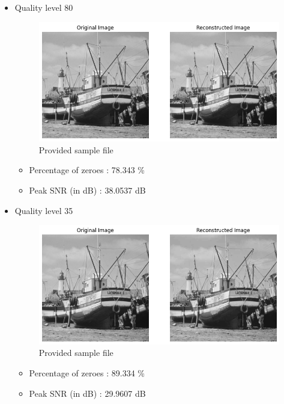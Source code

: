 \documentclass[11pt,a4paper]{article}
\begin{document}
\begin{itemize}
    \item Quality level 80
    {\begin{figure}[h]
        \centering
        \includegraphics[width=1.0\linewidth]{images/im2q1.png}
        \caption{Provided sample file}
    \end{figure}}

    \begin{itemize}
        \item Percentage of zeroes : 78.343 \%
        \item Peak SNR (in dB)     : 38.0537 dB
    \end{itemize}



    \item Quality level 35
    {\begin{figure}[h]
        \centering
        \includegraphics[width=1.0\linewidth]{images/im2q2.png}
        \caption{Provided sample file}
    \end{figure}}

    \begin{itemize}
        \item Percentage of zeroes : 89.334 \%
        \item Peak SNR (in dB)     : 29.9607 dB
    \end{itemize}


\end{itemize}
\end{document}
